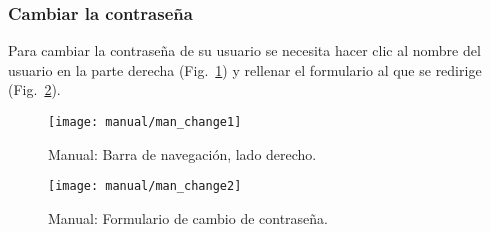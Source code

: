\subsubsection{Cambiar la contraseña}
Para cambiar la contraseña de su usuario se necesita hacer clic al nombre del usuario en la parte derecha (Fig.~\ref{fig:man_username}) y rellenar el formulario al que se  redirige (Fig.~\ref{fig:man_changepass}).

\begin{figure}
	\centering
	\texttt{[image: manual/man\_change1]}
	\caption{Manual: Barra de navegación, lado derecho.}
	\label{fig:man_username}
\end{figure}

\begin{figure}
	\centering
	\texttt{[image: manual/man\_change2]}
	\caption{Manual: Formulario de cambio de contraseña.}
	\label{fig:man_changepass}
\end{figure}
